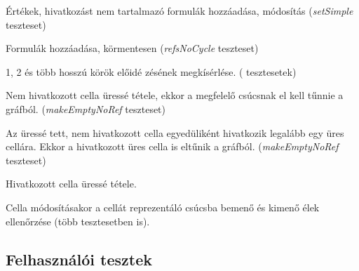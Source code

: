 \begin{compactenum}
	\item Értékek, hivatkozást nem tartalmazó formulák hozzáadása, módosítás (\textit{setSimple} teszteset)
	\item Formulák hozzáadása, körmentesen (\textit{refsNoCycle} teszteset)
	\item 1, 2 és több hosszú körök előidé	zésének megkísérlése. ( tesztesetek)
	\item Nem hivatkozott cella üressé tétele, ekkor a megfelelő csúcsnak el kell tűnnie a gráfból. (\textit{makeEmptyNoRef} teszteset)
	\item Az üressé tett, nem hivatkozott cella egyedüliként hivatkozik legalább egy üres cellára. Ekkor a hivatkozott üres cella is eltűnik a gráfból. (\textit{makeEmptyNoRef} teszteset)
	\item Hivatkozott cella üressé tétele.
	\item Cella módosításakor a cellát reprezentáló csúcsba bemenő és kimenő élek ellenőrzése (több tesztesetben is).
\end{compactenum}

\subsection{Felhasználói tesztek}

